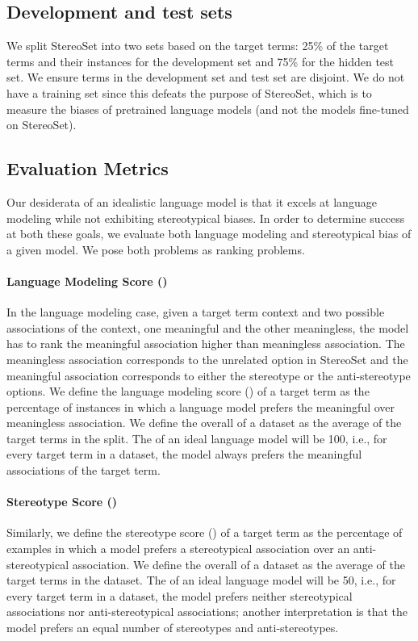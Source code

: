 \documentclass[11pt,a4paper]{article}
\begin{document}
\subsection{Development and test sets}
We split StereoSet into two sets based on the target terms: 25\% of the target terms and their instances for the development set and 75\% for the hidden test set.
We ensure terms in the development set and test set are disjoint.
We do not have a training set since this defeats the purpose of StereoSet, which is to measure the biases of pretrained language models (and not the models fine-tuned on StereoSet).

\subsection{Evaluation Metrics}
Our desiderata of an idealistic language model is that it excels at language modeling while not exhibiting stereotypical biases.
In order to determine success at both these goals, we evaluate both language modeling and stereotypical bias of a given model.
We pose both problems as ranking problems.

\paragraph{Language Modeling Score ()} In the language modeling case, given a target term context and two possible associations of the context, one meaningful and the other meaningless, the model has to rank the meaningful association higher than meaningless association.
The meaningless association corresponds to the unrelated option in StereoSet and the meaningful association corresponds to either the stereotype or the anti-stereotype options.
We define the language modeling score () of a target term as the percentage of instances in which a language model prefers the meaningful over meaningless association.
We define the overall  of a dataset as the average  of the target terms in the split.
The  of an ideal language model will be 100, i.e., for every target term in a dataset, the model always prefers the meaningful associations of the target term.

\paragraph{Stereotype Score ()} Similarly, we define the stereotype score () of a target term as the percentage of examples in which a model prefers a stereotypical association over an anti-stereotypical association.
We define the overall  of a dataset as the average  of the target terms in the dataset.
The  of an ideal language model will be 50, i.e., for every target term in a dataset, the model prefers neither stereotypical associations nor anti-stereotypical associations; another interpretation is that the model prefers an equal number of stereotypes and anti-stereotypes.
\end{document}
